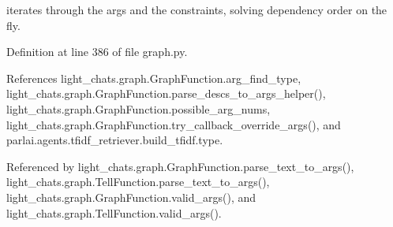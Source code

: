 \begin{DoxyVerb}iterates through the args and the constraints, solving dependency
order on the fly.
\end{DoxyVerb}
 

Definition at line 386 of file graph.\+py.



References light\+\_\+chats.\+graph.\+Graph\+Function.\+arg\+\_\+find\+\_\+type, light\+\_\+chats.\+graph.\+Graph\+Function.\+parse\+\_\+descs\+\_\+to\+\_\+args\+\_\+helper(), light\+\_\+chats.\+graph.\+Graph\+Function.\+possible\+\_\+arg\+\_\+nums, light\+\_\+chats.\+graph.\+Graph\+Function.\+try\+\_\+callback\+\_\+override\+\_\+args(), and parlai.\+agents.\+tfidf\+\_\+retriever.\+build\+\_\+tfidf.\+type.



Referenced by light\+\_\+chats.\+graph.\+Graph\+Function.\+parse\+\_\+text\+\_\+to\+\_\+args(), light\+\_\+chats.\+graph.\+Tell\+Function.\+parse\+\_\+text\+\_\+to\+\_\+args(), light\+\_\+chats.\+graph.\+Graph\+Function.\+valid\+\_\+args(), and light\+\_\+chats.\+graph.\+Tell\+Function.\+valid\+\_\+args().

